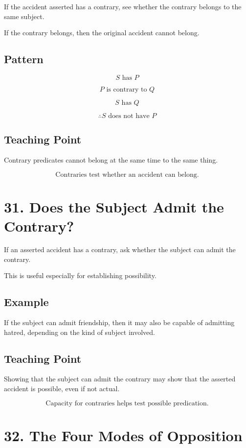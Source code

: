 \documentclass[12pt]{article}
\begin{document}
If the accident asserted has a contrary, see whether the contrary belongs to
the same subject.

If the contrary belongs, then the original accident cannot belong.

\subsection*{Pattern}

\[
S \text{ has } P
\]

\[
P \text{ is contrary to } Q
\]

\[
S \text{ has } Q
\]

\[
\therefore S \text{ does not have } P
\]

\subsection*{Teaching Point}

Contrary predicates cannot belong at the same time to the same thing.

\[
\boxed{
\text{Contraries test whether an accident can belong.}
}
\]

\section*{31. Does the Subject Admit the Contrary?}

If an asserted accident has a contrary, ask whether the subject can admit the
contrary.

This is useful especially for establishing possibility.

\subsection*{Example}

If the subject can admit friendship, then it may also be capable of admitting
hatred, depending on the kind of subject involved.

\subsection*{Teaching Point}

Showing that the subject can admit the contrary may show that the asserted
accident is possible, even if not actual.

\[
\boxed{
\text{Capacity for contraries helps test possible predication.}
}
\]

\section*{32. The Four Modes of Opposition}
\end{document}
